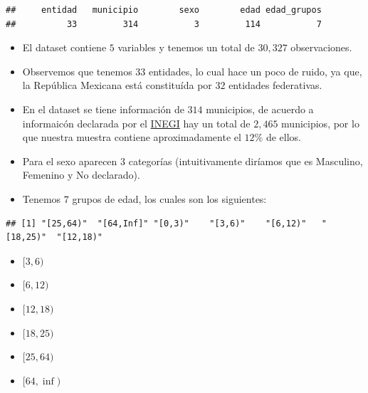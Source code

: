 \documentclass[
]{article}
\newenvironment{Shaded}{\begin{snugshade}}{\end{snugshade}}
\newcommand{\NormalTok}[1]{#1}
\newcommand{\OperatorTok}[1]{\textcolor[rgb]{0.81,0.36,0.00}{\textbf{#1}}}
\newcommand{\StringTok}[1]{\textcolor[rgb]{0.31,0.60,0.02}{#1}}
\providecommand{\tightlist}{%
  \setlength{\itemsep}{0pt}\setlength{\parskip}{0pt}}
\begin{document}
\begin{verbatim}
##     entidad   municipio        sexo        edad edad_grupos 
##          33         314           3         114           7
\end{verbatim}

\begin{itemize}
\item
  El dataset contiene \(5\) variables y tenemos un total de \(30,327\)
  observaciones.
\item
  Observemos que tenemos \(33\) entidades, lo cual hace un poco de
  ruido, ya que, la República Mexicana está constituída por \(32\)
  entidades federativas.
\item
  En el dataset se tiene información de \(314\) municipios, de acuerdo a
  informaicón declarada por el
  \href{http://cuentame.inegi.org.mx/territorio/division/default.aspx?tema=T\#:~:text=Para\%20gobernar\%2C\%20organizar\%20y\%20administrar,todo\%20el\%20pa\%C3\%ADs\%202\%20457.}{INEGI}
  hay un total de \(2,465\) municipios, por lo que nuestra muestra
  contiene aproximadamente el \(12\%\) de ellos.
\item
  Para el sexo aparecen \(3\) categorías (intuitivamente diríamos que es
  Masculino, Femenino y No declarado).
\item
  Tenemos \(7\) grupos de edad, los cuales son los siguientes:
\end{itemize}

\begin{Shaded}
\end{Shaded}

\begin{verbatim}
## [1] "[25,64)"  "[64,Inf]" "[0,3)"    "[3,6)"    "[6,12)"   "[18,25)"  "[12,18)"
\end{verbatim}

\begin{itemize}
\tightlist
\item
  \([3, 6)\)
\item
  \([6, 12)\)
\item
  \([12, 18)\)
\item
  \([18, 25)\)
\item
  \([25, 64)\)
\item
  \([64, \inf)\)
\end{itemize}
\end{document}
